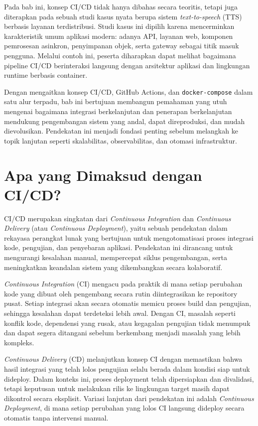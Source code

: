 Pada bab ini, konsep CI/CD tidak hanya dibahas secara teoritis, tetapi juga diterapkan pada sebuah studi kasus nyata berupa sistem \textit{text-to-speech} (TTS) berbasis layanan terdistribusi. Studi kasus ini dipilih karena mencerminkan karakteristik umum aplikasi modern: adanya API, layanan web, komponen pemrosesan asinkron, penyimpanan objek, serta gateway sebagai titik masuk pengguna. Melalui contoh ini, peserta diharapkan dapat melihat bagaimana pipeline CI/CD berinteraksi langsung dengan arsitektur aplikasi dan lingkungan runtime berbasis container.

Dengan mengaitkan konsep CI/CD, GitHub Actions, dan \texttt{docker-compose} dalam satu alur terpadu, bab ini bertujuan membangun pemahaman yang utuh mengenai bagaimana integrasi berkelanjutan dan penerapan berkelanjutan mendukung pengembangan sistem yang andal, dapat direproduksi, dan mudah dievolusikan. Pendekatan ini menjadi fondasi penting sebelum melangkah ke topik lanjutan seperti skalabilitas, observabilitas, dan otomasi infrastruktur.


\section{Apa yang Dimaksud dengan CI/CD?}

CI/CD merupakan singkatan dari \textit{Continuous Integration} dan
\textit{Continuous Delivery} (atau \textit{Continuous Deployment}), yaitu
sebuah pendekatan dalam rekayasa perangkat lunak yang bertujuan untuk
mengotomatisasi proses integrasi kode, pengujian, dan penyebaran aplikasi.
Pendekatan ini dirancang untuk mengurangi kesalahan manual, mempercepat siklus
pengembangan, serta meningkatkan keandalan sistem yang dikembangkan secara
kolaboratif.

\textit{Continuous Integration} (CI) mengacu pada praktik di mana setiap
perubahan kode yang dibuat oleh pengembang secara rutin diintegrasikan ke
repository pusat. Setiap integrasi akan secara otomatis memicu proses build
dan pengujian, sehingga kesalahan dapat terdeteksi lebih awal. Dengan CI,
masalah seperti konflik kode, dependensi yang rusak, atau kegagalan pengujian
tidak menumpuk dan dapat segera ditangani sebelum berkembang menjadi masalah
yang lebih kompleks.

\textit{Continuous Delivery} (CD) melanjutkan konsep CI dengan memastikan
bahwa hasil integrasi yang telah lolos pengujian selalu berada dalam kondisi
siap untuk dideploy. Dalam konteks ini, proses deployment telah dipersiapkan
dan divalidasi, tetapi keputusan untuk melakukan rilis ke lingkungan target
masih dapat dikontrol secara eksplisit. Variasi lanjutan dari pendekatan ini
adalah \textit{Continuous Deployment}, di mana setiap perubahan yang lolos CI
langsung dideploy secara otomatis tanpa intervensi manual.

